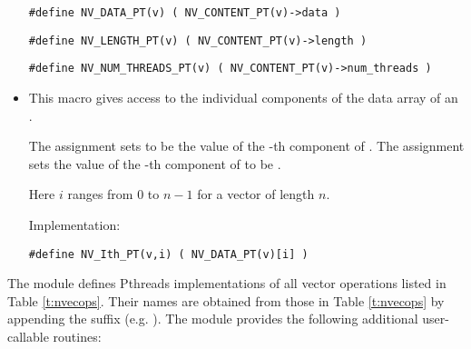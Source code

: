 \begin{itemize}
  \verb|#define NV_DATA_PT(v) ( NV_CONTENT_PT(v)->data )|
  
  \verb|#define NV_LENGTH_PT(v) ( NV_CONTENT_PT(v)->length )|

  \verb|#define NV_NUM_THREADS_PT(v) ( NV_CONTENT_PT(v)->num_threads )|

\item {}                                               
                                                            
  This macro gives access to the individual components of the data
  array of an .

  The assignment  sets  to be the value of 
  the -th component of . The assignment    
  sets the value of the -th component of  to be .        
  
  Here $i$ ranges from $0$ to $n-1$ for a vector of length $n$.

  Implementation:

  \verb|#define NV_Ith_PT(v,i) ( NV_DATA_PT(v)[i] )|

\end{itemize}
The {\nvecpthreads} module defines Pthreads implementations of all vector operations listed 
in Table \ref{t:nvecops}. Their names are obtained from those in Table \ref{t:nvecops}
by appending the suffix  (e.g. ).
The module {\nvecpthreads} provides the following additional user-callable routines:
